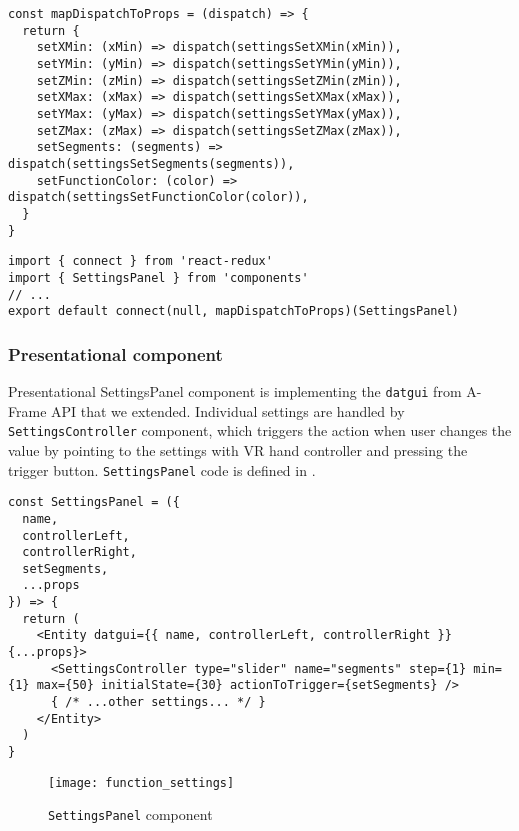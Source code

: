 \begin{lstlisting}[caption={Function to map dispatchable \texttt{settings} action creators to component properties.},captionpos=b]
const mapDispatchToProps = (dispatch) => {
  return {
    setXMin: (xMin) => dispatch(settingsSetXMin(xMin)),
    setYMin: (yMin) => dispatch(settingsSetYMin(yMin)),
    setZMin: (zMin) => dispatch(settingsSetZMin(zMin)),
    setXMax: (xMax) => dispatch(settingsSetXMax(xMax)),
    setYMax: (yMax) => dispatch(settingsSetYMax(yMax)),
    setZMax: (zMax) => dispatch(settingsSetZMax(zMax)),
    setSegments: (segments) => dispatch(settingsSetSegments(segments)),
    setFunctionColor: (color) => dispatch(settingsSetFunctionColor(color)),
  }
}
\end{lstlisting}

\begin{lstlisting}[caption={Creation of \texttt{SettingsPanel} higher-order component.},captionpos=b]
import { connect } from 'react-redux'
import { SettingsPanel } from 'components'
// ...
export default connect(null, mapDispatchToProps)(SettingsPanel)
\end{lstlisting}

\subsubsection{Presentational component}
Presentational SettingsPanel component is implementing the \texttt{datgui} from A-Frame API that we extended. Individual settings are handled by \texttt{SettingsController} component, which triggers the action when user changes the value by pointing to the settings with VR hand controller and pressing the trigger button. \texttt{SettingsPanel} code is defined in .

\begin{lstlisting}[caption={Presentational \textsl{Calculator} component code.},captionpos=b]
const SettingsPanel = ({
  name,
  controllerLeft,
  controllerRight,
  setSegments,
  ...props
}) => {
  return (
    <Entity datgui={{ name, controllerLeft, controllerRight }} {...props}>
      <SettingsController type="slider" name="segments" step={1} min={1} max={50} initialState={30} actionToTrigger={setSegments} />
      { /* ...other settings... */ }
    </Entity>
  )
} 
\end{lstlisting}

\begin{figure}[ht!]
\centering
\texttt{[image: function\_settings]}
\caption{\texttt{SettingsPanel} component}
\label{r:65}
\end{figure}

